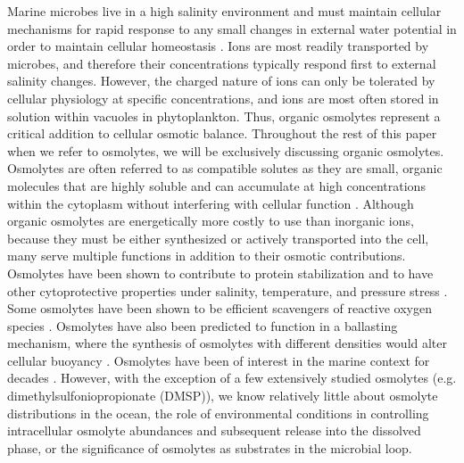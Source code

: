 \documentclass[utf8]{frontiersSCNS} %
\begin{document}
Marine microbes live in a high salinity environment and must maintain cellular mechanisms for rapid response to any small changes in external water potential in order to maintain cellular homeostasis \citep{Bisson1995}. Ions are most readily transported by microbes, and therefore their concentrations typically respond first to external salinity changes. However, the charged nature of ions can only be tolerated by cellular physiology at specific concentrations, and ions are most often stored in solution within vacuoles in phytoplankton. Thus, organic osmolytes represent a critical addition to cellular osmotic balance. Throughout the rest of this paper when we refer to osmolytes, we will be exclusively discussing organic osmolytes. Osmolytes are often referred to as compatible solutes as they are small, organic molecules that are highly soluble and can accumulate at high concentrations within the cytoplasm without interfering with cellular function \citep{Roebler2001,Stefels2000}. Although organic osmolytes are energetically more costly to use than inorganic ions, because they must be either synthesized or actively transported into the cell, many serve multiple functions in addition to their osmotic contributions. Osmolytes have been shown to contribute to protein stabilization and to have other cytoprotective properties under salinity, temperature, and pressure stress \citep{Kirst1989,Ma2017,Yancey2015,Burg2008}. Some osmolytes have been shown to be efficient scavengers of reactive oxygen species \citep{Smirnoff1989,Sunda2002,Brands2019}. Osmolytes have also been predicted to function in a ballasting mechanism, where the synthesis of osmolytes with different densities would alter cellular buoyancy \citep{Boyd2002,Lavoie2015}. Osmolytes have been of interest in the marine context for decades \citep{Challenger1951,Yancey1982,Kiene1998,Keller1999}. However, with the exception of a few extensively studied osmolytes (e.g. dimethylsulfoniopropionate (DMSP)), we know relatively little about osmolyte distributions in the ocean, the role of environmental conditions in controlling intracellular osmolyte abundances and subsequent release into the dissolved phase, or the significance of osmolytes as substrates in the microbial loop.
\end{document}

